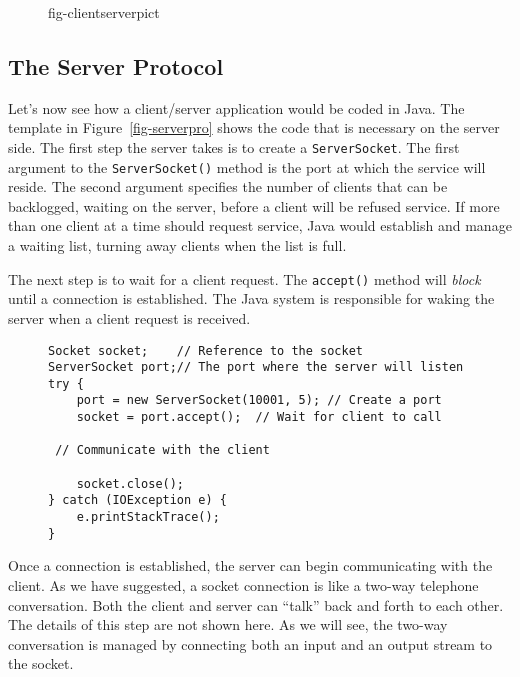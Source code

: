 {

\begin{figure}[hbt]
{fig-clientserverpict}
\end{figure}

\subsection{The Server Protocol}
\noindent Let's now see how a client/server application would be coded in Java.
The template in Figure~\ref{fig-serverpro} shows the code that is
necessary on the server side.   The first step the server takes is to
create a {\tt ServerSocket}.  The first argument to the
{\tt ServerSocket()} method is the port at which the service will
reside.  The second argument specifies the number of clients that can
be backlogged, waiting on the server, before a client will be refused
service.   If more than one client at a time should request service,
Java would establish and manage a waiting list, turning away clients
when the list is full.

The next step is to wait for a client request.  The {\tt accept()}
method will {\it block} until a connection is established.   The Java
system is responsible for waking the server when a client request
is received.

\begin{figure}[thb]
\jjjprogstart
\begin{jjjlisting}
\begin{lstlisting}
Socket socket;    // Reference to the socket
ServerSocket port;// The port where the server will listen
try {
    port = new ServerSocket(10001, 5); // Create a port
    socket = port.accept();  // Wait for client to call

 // Communicate with the client

    socket.close();
} catch (IOException e) {
    e.printStackTrace();
}
\end{lstlisting}
\end{jjjlisting}
\end{figure}

Once a connection is established, the server can begin communicating
with the client.  As we have suggested, a socket connection is like
a two-way telephone conversation.  Both the client and server can
``talk'' back and forth to each other.  The details of this step
are not shown here.  As we will see, the two-way conversation
is managed by connecting both an input and an output stream to
the socket.

}
